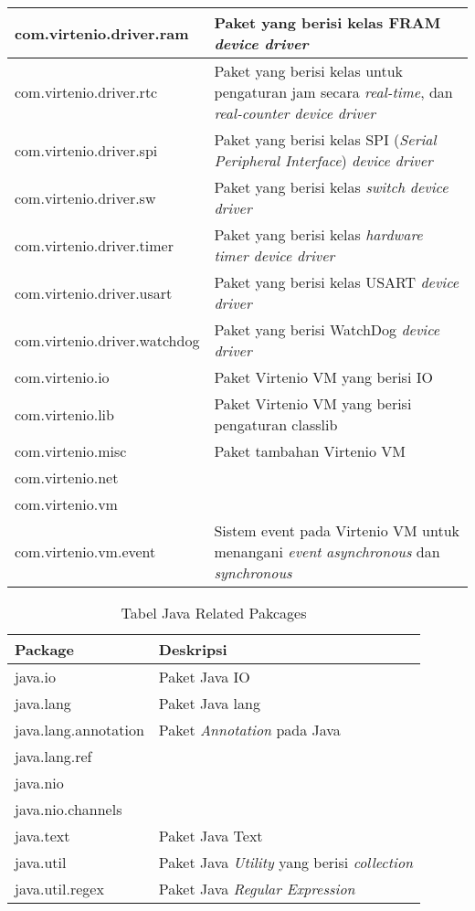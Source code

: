 \begin{table}[H]
{\begin{tabular}{|l|l|}
		\hline 
		com.virtenio.driver.ram & Paket yang berisi kelas FRAM \textit{device driver} \\ 
		\hline 
		com.virtenio.driver.rtc & Paket yang berisi kelas untuk pengaturan jam secara \textit{real-time}, dan \textit{real-counter device driver} \\ 
		\hline 
		com.virtenio.driver.spi & Paket yang berisi kelas SPI (\textit{Serial Peripheral Interface}) \textit{device driver} \\ 
		\hline 
		com.virtenio.driver.sw & Paket yang berisi kelas \textit{switch device driver} \\ 
		\hline 
		com.virtenio.driver.timer & Paket yang berisi kelas \textit{hardware timer device driver} \\ 
		\hline 
		com.virtenio.driver.usart & Paket yang berisi kelas USART \textit{device driver} \\ 
		\hline 
		com.virtenio.driver.watchdog & Paket yang berisi WatchDog \textit{device driver} \\ 
		\hline 
		com.virtenio.io & Paket Virtenio VM yang berisi IO \\ 
		\hline 
		com.virtenio.lib & Paket Virtenio VM yang berisi pengaturan classlib \\ 
		\hline 
		com.virtenio.misc & Paket tambahan Virtenio VM \\ 
		\hline 
		com.virtenio.net &  \\ 
		\hline 
		com.virtenio.vm & \\ 
		\hline 
		com.virtenio.vm.event & Sistem event pada Virtenio VM untuk menangani \textit{event} \textit{asynchronous} dan \textit{synchronous} \\ 
		\hline 
		\end{tabular} 
	}
\end{table}

\begin{table}[H]
	\centering
	\caption{Tabel Java Related Pakcages}
		\begin{tabular}{|l|l|}
			\hline 
			Package & Deskripsi \\ 
			\hline 
			java.io & Paket Java IO \\ 
			\hline 
			java.lang & Paket Java lang \\ 
			\hline
			java.lang.annotation & Paket \textit{Annotation} pada Java \\
			\hline
			java.lang.ref & \\
			\hline
			java.nio & \\
			\hline
			java.nio.channels & \\
			\hline 
			java.text & Paket Java Text \\
			\hline
			java.util & Paket Java \textit{Utility} yang berisi \textit{collection} \\
			\hline
			java.util.regex & Paket Java \textit{Regular Expression} \\
			\hline
		\end{tabular}
\end{table}

